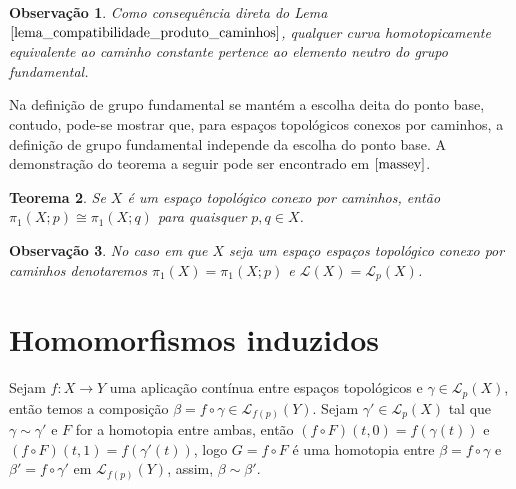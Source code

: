 \documentclass[12pt]{book}
\newtheorem{teorema}{Teorema}[section]
\newtheorem{observacao}[teorema]{Observação}
\newcommand{\caminhossempontobase}[1]{\mathcal{L}(#1)}
\newcommand{\caminhospontobasegeral}[2]{\mathcal{L}_{#1}(#2)}
\newcommand{\grupofundamental}[1]{\pi_{1}(#1)}
\newcommand{\grupofundamentalpontobase}[2]{\pi_{1}(#1; #2)}
\begin{document}
	
	\begin{observacao}
		Como consequência direta do Lema $\ref{lema_compatibilidade_produto_caminhos}$, qualquer curva homotopicamente equivalente ao caminho constante pertence ao elemento neutro do grupo fundamental.
	\end{observacao}
	
	Na definição de grupo fundamental se mantém a escolha deita do ponto base, contudo, pode-se mostrar que, para espaços topológicos conexos por caminhos, a definição de grupo fundamental independe da escolha do ponto base. A demonstração do teorema a seguir pode ser encontrado em $\cite{massey}$.
	
	\begin{teorema}
		Se $X$ é um espaço topológico conexo por caminhos, então $\grupofundamentalpontobase{X}{p} \cong \grupofundamentalpontobase{X}{q}$ para quaisquer $p,q \in X$.
	\end{teorema}
	
	\begin{observacao}\label{observacao_grupo_funcamental_sem_ponto_base}
		No caso em que $X$ seja um espaço espaços topológico conexo por caminhos denotaremos $\grupofundamental{X}=\grupofundamentalpontobase{X}{p}$ e $\caminhossempontobase{X}=\caminhospontobasegeral{p}{X}$.
	\end{observacao}
	
	\section{Homomorfismos induzidos}
		Sejam $f:X\to Y$ uma aplicação contínua entre espaços topológicos e $\gamma \in \caminhospontobasegeral{p}{X}$, então temos a composição $\beta=f\circ \gamma \in \caminhospontobasegeral{f(p)}{Y}$. Sejam $\gamma' \in \caminhospontobasegeral{p}{X}$ tal que $\gamma \sim \gamma'$ e $F$ for a homotopia entre ambas, então $(f\circ F)(t,0) =  f(\gamma(t))$ e $(f\circ F)(t,1) =  f(\gamma'(t)) $, logo $G=f\circ F$ é uma homotopia entre $\beta=f\circ \gamma$ e $\beta' = f\circ \gamma'$ em $\caminhospontobasegeral{f(p)}{Y}$, assim, $\beta \sim \beta'$.
		
\end{document}
